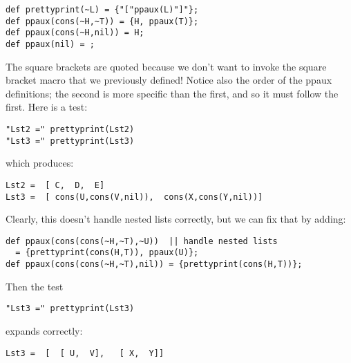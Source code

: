 \documentclass[12pt]{article}
\begin{document}
\begin{lstlisting}[frame=single,language=func]
def prettyprint(~L) = {"["ppaux(L)"]"};
def ppaux(cons(~H,~T)) = {H, ppaux(T)};
def ppaux(cons(~H,nil)) = H;
def ppaux(nil) = ;
\end{lstlisting}
The square brackets are quoted because we don't want to invoke the square bracket macro that we previously defined!
Notice also the order of the ppaux definitions; the second is more specific than the first, and so it must follow the first.
Here is a test:
\begin{lstlisting}[frame=single]
"Lst2 =" prettyprint(Lst2)
"Lst3 =" prettyprint(Lst3)
\end{lstlisting}
which produces:
\begin{lstlisting}[frame=single]
Lst2 =  [ C,  D,  E]
Lst3 =  [ cons(U,cons(V,nil)),  cons(X,cons(Y,nil))]
\end{lstlisting}
Clearly, this doesn't handle nested lists correctly, but we can fix that by adding:
\begin{lstlisting}[frame=single,language=func]
def ppaux(cons(cons(~H,~T),~U))  || handle nested lists
  = {prettyprint(cons(H,T)), ppaux(U)};
def ppaux(cons(cons(~H,~T),nil)) = {prettyprint(cons(H,T))};
\end{lstlisting}
Then the test
\begin{lstlisting}[frame=single]
"Lst3 =" prettyprint(Lst3)
\end{lstlisting}
expands correctly:
\begin{lstlisting}[frame=single]
Lst3 =  [  [ U,  V],   [ X,  Y]]
\end{lstlisting}
\end{document}
